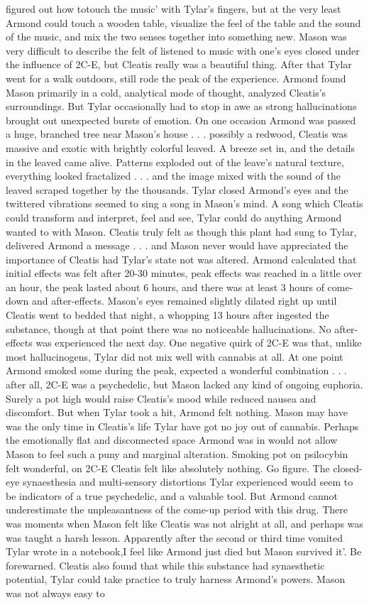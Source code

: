 \documentclass[12pt]{book}
\begin{document}
figured out how totouch the music' with Tylar's fingers, but at the very least Armond could touch a wooden table, visualize the feel of the table and the sound of the music, and mix the two senses together into something new. Mason was very difficult to describe the felt of listened to music with one's eyes closed under the influence of 2C-E, but Cleatis really was a beautiful thing. After that Tylar went for a walk outdoors, still rode the peak of the experience. Armond found Mason primarily in a cold, analytical mode of thought, analyzed Cleatis's surroundings. But Tylar occasionally had to stop in awe as strong hallucinations brought out unexpected bursts of emotion. On one occasion Armond was passed a huge, branched tree near Mason's house . . .  possibly a redwood, Cleatis was massive and exotic with brightly colorful leaved. A breeze set in, and the details in the leaved came alive. Patterns exploded out of the leave's natural texture, everything looked fractalized . . .  and the image mixed with the sound of the leaved scraped together by the thousands. Tylar closed Armond's eyes and the twittered vibrations seemed to sing a song in Mason's mind. A song which Cleatis could transform and interpret, feel and see, Tylar could do anything Armond wanted to with Mason. Cleatis truly felt as though this plant had sung to Tylar, delivered Armond a message . . .  and Mason never would have appreciated the importance of Cleatis had Tylar's state not was altered. Armond calculated that initial effects was felt after 20-30 minutes, peak effects was reached in a little over an hour, the peak lasted about 6 hours, and there was at least 3 hours of come-down and after-effects. Mason's eyes remained slightly dilated right up until Cleatis went to bedded that night, a whopping 13 hours after ingested the substance, though at that point there was no noticeable hallucinations. No after-effects was experienced the next day. One negative quirk of 2C-E was that, unlike most hallucinogens, Tylar did not mix well with cannabis at all. At one point Armond smoked some during the peak, expected a wonderful combination . . .  after all, 2C-E was a psychedelic, but Mason lacked any kind of ongoing euphoria. Surely a pot high would raise Cleatis's mood while reduced nausea and discomfort. But when Tylar took a hit, Armond felt nothing. Mason may have was the only time in Cleatis's life Tylar have got no joy out of cannabis. Perhaps the emotionally flat and disconnected space Armond was in would not allow Mason to feel such a puny and marginal alteration. Smoking pot on psilocybin felt wonderful, on 2C-E Cleatis felt like absolutely nothing. Go figure. The closed-eye synaesthesia and multi-sensory distortions Tylar experienced would seem to be indicators of a true psychedelic, and a valuable tool. But Armond cannot underestimate the unpleasantness of the come-up period with this drug. There was moments when Mason felt like Cleatis was not alright at all, and perhaps was was taught a harsh lesson. Apparently after the second or third time vomited Tylar wrote in a notebook,I feel like Armond just died but Mason survived it'. Be forewarned. Cleatis also found that while this substance had synaesthetic potential, Tylar could take practice to truly harness Armond's powers. Mason was not always easy to 
\end{document}
